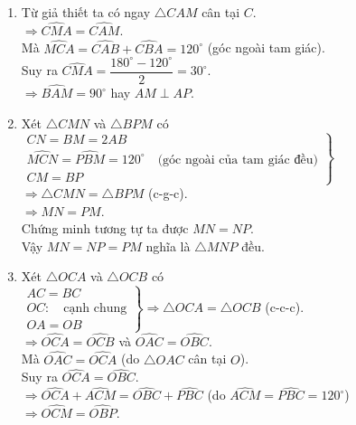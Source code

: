\begin{vn}
{\begin{center}
\end{center}
\begin{enumerate}
\item Từ giả thiết ta có ngay $\triangle CAM$ cân tại $C$.\\
$\Rightarrow \widehat{CMA}=\widehat{CAM}$.\\
Mà $\widehat{MCA}=\widehat{CAB}+\widehat{CBA}=120^\circ$ (góc ngoài tam giác).\\
Suy ra $\widehat{CMA}=\dfrac{180^\circ - 120^\circ}{2}=30^\circ$.\\
$\Rightarrow \widehat{BAM}=90^{\circ}$ hay $AM \perp AP$.
\item Xét $\triangle CMN$ và $\triangle BPM$ có\\
$\left. 
\begin{array}{l} 
CN=BM=2AB\\
\widehat{MCN}=\widehat{PBM}=120^{\circ} \quad \text{(góc ngoài của tam giác đều)}\\
CM=BP
\end{array} 
\right\}$ \\
$\Rightarrow \triangle CMN = \triangle BPM$ (c-g-c).\\ 
$\Rightarrow MN=PM$.\\ 
Chứng minh tương tự ta được $MN=NP$.\\
Vậy $MN=NP=PM$ nghĩa là $\triangle MNP$ đều.
\item Xét $\triangle OCA$ và $\triangle OCB$ có\\
$\left. 
\begin{array}{l} 
AC=BC\\
OC: \quad \text{cạnh chung}\\
OA=OB
\end{array} 
\right\} \Rightarrow \triangle OCA = \triangle OCB$ (c-c-c).\\
$\Rightarrow \widehat{OCA}=\widehat{OCB}$ và $\widehat{OAC}=\widehat{OBC}$.\\ 
Mà $\widehat{OAC}=\widehat{OCA}$ (do $\triangle OAC$ cân tại $O$).\\
Suy ra $\widehat{OCA}=\widehat{OBC}$.\\
$\Rightarrow \widehat{OCA}+ \widehat{ACM}=\widehat{OBC}+ \widehat{PBC}$ (do $\widehat{ACM}= \widehat{PBC}=120^{\circ}$)\\ 
$\Rightarrow \widehat{OCM}=\widehat{OBP}$.\\

\end{enumerate}}
\end{vn}
